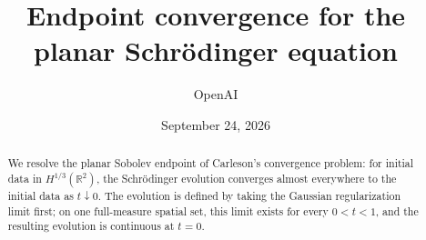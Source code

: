 \documentclass[11pt]{article}
\title{Endpoint convergence for the planar Schr\"odinger equation}
\author{OpenAI}
\date{September 24, 2026}
\numberwithin{equation}{section}
\theoremstyle{definition}
\theoremstyle{remark}
\newcommand{\R}{\mathbb R}
\begin{document}
\maketitle
\begin{abstract}
We resolve the planar Sobolev endpoint of Carleson's convergence problem:
for initial data in $H^{1/3}(\R^2)$, the Schr\"odinger evolution converges
almost everywhere to the initial data as $t\downarrow0$. The evolution is
defined by taking the Gaussian regularization limit first; on one full-measure
spatial set, this limit exists for every $0<t<1$, and the resulting evolution
is continuous at $t=0$.
\end{abstract}
\tableofcontents









\clearpage
{}
{}

\end{document}

